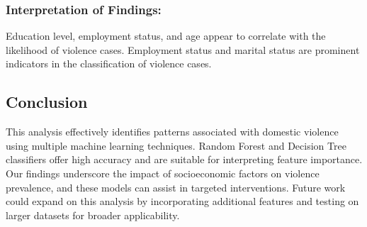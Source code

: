 \documentclass[
]{article}
\begin{document}
\hypertarget{interpretation-of-findings}{%
\subsubsection{Interpretation of
Findings:}\label{interpretation-of-findings}}

Education level, employment status, and age appear to correlate with the
likelihood of violence cases. Employment status and marital status are
prominent indicators in the classification of violence cases.

\hypertarget{conclusion}{%
\subsection{Conclusion}\label{conclusion}}

This analysis effectively identifies patterns associated with domestic
violence using multiple machine learning techniques. Random Forest and
Decision Tree classifiers offer high accuracy and are suitable for
interpreting feature importance. Our findings underscore the impact of
socioeconomic factors on violence prevalence, and these models can
assist in targeted interventions. Future work could expand on this
analysis by incorporating additional features and testing on larger
datasets for broader applicability.
\end{document}
